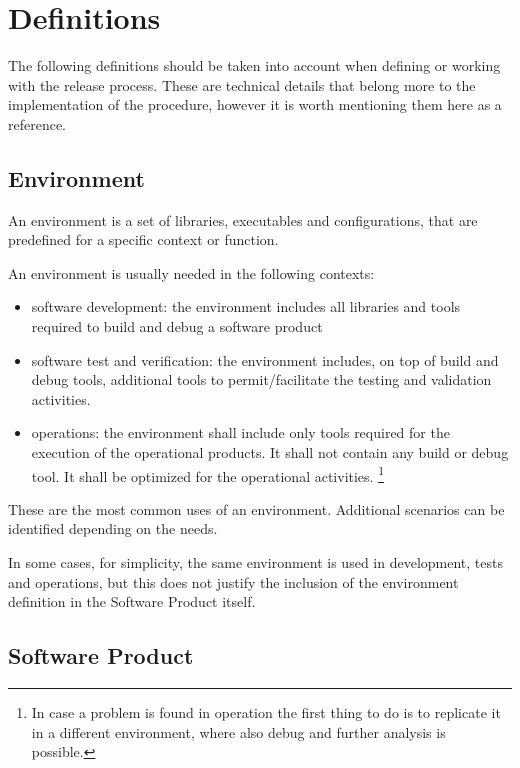 \section{Definitions} \label{sec:defs}

The following definitions should be taken into account when defining or working with the release process.
These are technical details that belong more to the implementation of the procedure,
however it is worth mentioning them here as a reference.


\subsection{Environment} \label{sec:envdef}

An environment is a set of libraries, executables and configurations, that are predefined for a specific context or function.

An environment is usually needed in the following contexts:

\begin{itemize}
\item software development: the environment includes all libraries and tools required to build and debug a software product
\item software test and verification: the environment includes, on top of build and debug tools, additional tools to permit/facilitate the testing and validation activities.
\item operations: the environment shall include only tools required for the execution of the operational products. It shall not contain any build or debug tool. It shall be optimized for the operational activities. \footnote{In case a problem is found in operation the first thing to do is to replicate it in a different environment, where also debug and further analysis is possible.}
\end{itemize}

These are the most common uses of an environment. Additional scenarios can be identified depending on the needs.

In some cases, for simplicity, the same environment is used in development, tests and operations, but this does not justify the inclusion of the environment definition in the Software Product itself.


\subsection{Software Product} \label{sec:swdef}

